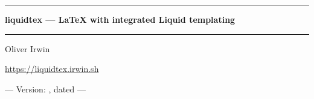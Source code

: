 \begin{titlepage}
\vfill
\begin{center}

\vfill
\vspace*{8cm}

\textcolor{lqt-lightblue}{\rule{8cm}{2pt}}

\vspace{12pt}
{\LARGE \bfseries\sffamily \textcolor{lqt-lightblue}{liquidtex} --- \textrm{\LaTeX} with integrated Liquid templating}\\
\vspace{12pt}
\textcolor{lqt-lightblue}{\rule{8cm}{2pt}}

\vspace{12pt}

{\large\sffamily Oliver Irwin}

\vspace{0pt}

{\large\enspace\url{https://liquidtex.irwin.sh}}

\end{center}

\vfill

\begin{center}
  \sffamily
  --- Version: \liquidtexversion{}, dated \DTMdate{\liquidtexdate} ---
\end{center}



\clearpage
\pagestyle{empty}
\hspace{0pt}
\vfill
\vspace*{-1cm}
\begin{abstract}
  The  package integrates a
   templating layer into the
  \LaTeX{} compilation process. %
  It allows authors to incorporate templated, data-driven content into
  their documents by automatically rendering Liquid templates at compile
  time.
\end{abstract}
\vfill
\hspace{0pt}
\clearpage{\pagestyle{empty}\cleardoublepage}

\end{titlepage}


\restoregeometry

